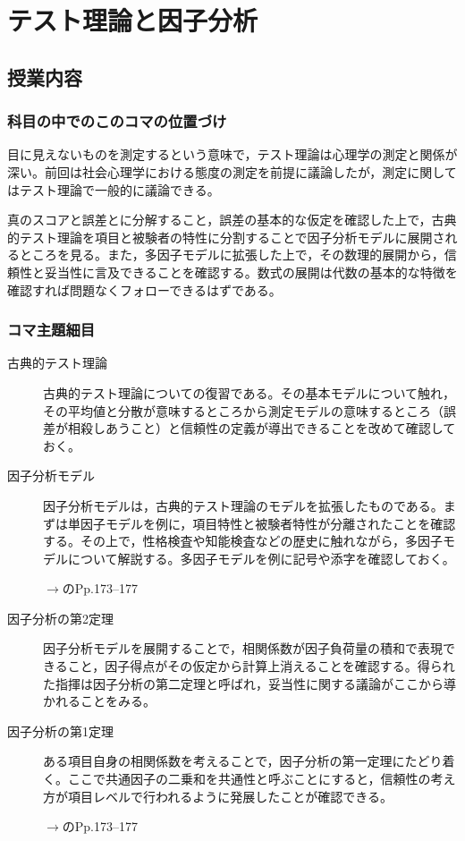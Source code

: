 \section{テスト理論と因子分析}
\subsection{授業内容}
\subsubsection{科目の中でのこのコマの位置づけ}
目に見えないものを測定するという意味で，テスト理論は心理学の測定と関係が深い。前回は社会心理学における態度の測定を前提に議論したが，測定に関してはテスト理論で一般的に議論できる。

真のスコアと誤差とに分解すること，誤差の基本的な仮定を確認した上で，古典的テスト理論を項目と被験者の特性に分割することで因子分析モデルに展開されるところを見る。また，多因子モデルに拡張した上で，その数理的展開から，信頼性と妥当性に言及できることを確認する。数式の展開は代数の基本的な特徴を確認すれば問題なくフォローできるはずである。

\subsubsection{コマ主題細目}
\begin{description}
	\item[古典的テスト理論]古典的テスト理論についての復習である。その基本モデルについて触れ，その平均値と分散が意味するところから測定モデルの意味するところ（誤差が相殺しあうこと）と信頼性の定義が導出できることを改めて確認しておく。

	\item[因子分析モデル]因子分析モデルは，古典的テスト理論のモデルを拡張したものである。まずは単因子モデルを例に，項目特性と被験者特性が分離されたことを確認する。その上で，性格検査や知能検査などの歴史に触れながら，多因子モデルについて解説する。多因子モデルを例に記号や添字を確認しておく。
	      \begin{flushright}
		      $\to$\citet{kosugi2018}のPp.173--177
	      \end{flushright}

	\item[因子分析の第2定理]因子分析モデルを展開することで，相関係数が因子負荷量の積和で表現できること，因子得点がその仮定から計算上消えることを確認する。得られた指揮は因子分析の第二定理と呼ばれ，妥当性に関する議論がここから導かれることをみる。

	\item[因子分析の第1定理]ある項目自身の相関係数を考えることで，因子分析の第一定理にたどり着く。ここで共通因子の二乗和を共通性と呼ぶことにすると，信頼性の考え方が項目レベルで行われるように発展したことが確認できる。
	      \begin{flushright}
		      $\to$\citet{kosugi2018}のPp.173--177
	      \end{flushright}
\end{description}
